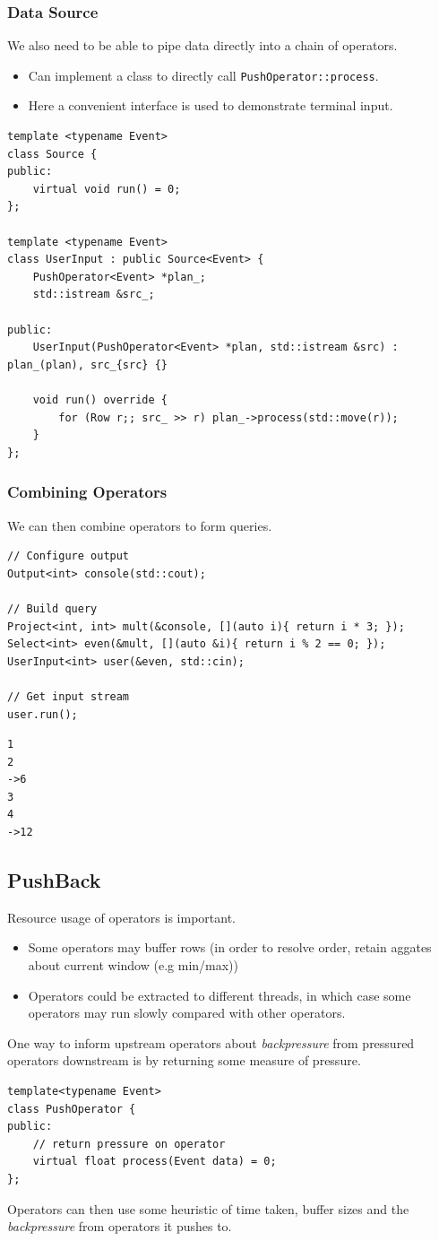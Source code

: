 \subsubsection{Data Source}
We also need to be able to pipe data directly into a chain of operators.
\begin{itemize}
    \item Can implement a class to directly call \texttt{PushOperator::process}.
    \item Here a convenient interface is used to demonstrate terminal input.
\end{itemize}
\begin{verbatim}
template <typename Event>
class Source {
public:
    virtual void run() = 0;
};

template <typename Event>
class UserInput : public Source<Event> {
    PushOperator<Event> *plan_;
    std::istream &src_;

public:
    UserInput(PushOperator<Event> *plan, std::istream &src) : plan_(plan), src_{src} {}

    void run() override {
        for (Row r;; src_ >> r) plan_->process(std::move(r));
    }
};
\end{verbatim}

\subsubsection{Combining Operators}
We can then combine operators to form queries.
\begin{verbatim}
// Configure output
Output<int> console(std::cout);

// Build query
Project<int, int> mult(&console, [](auto i){ return i * 3; });
Select<int> even(&mult, [](auto &i){ return i % 2 == 0; });
UserInput<int> user(&even, std::cin);

// Get input stream
user.run();
\end{verbatim}
\begin{verbatim}
1
2
->6
3
4
->12
\end{verbatim}

\subsection{PushBack}
Resource usage of operators is important.
\begin{itemize}
    \item Some operators may buffer rows (in order to resolve order, retain aggates about current window (e.g min/max))
    \item Operators could be extracted to different threads, in which case some operators may run slowly compared with other operators.
\end{itemize}
One way to inform upstream operators about \textit{backpressure} from pressured operators downstream is by returning some measure of pressure.
\begin{verbatim}
template<typename Event>
class PushOperator {
public:
    // return pressure on operator
    virtual float process(Event data) = 0;
};
\end{verbatim}
Operators can then use some heuristic of time taken, buffer sizes and the \textit{backpressure} from operators it pushes to.

